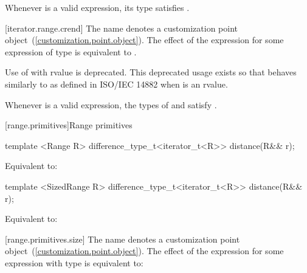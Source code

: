 \pnum
\enternote Whenever  is a valid expression, its
type satisfies . \exitnote

[iterator.range.crend]{}
\pnum
The name  denotes a customization point
object~(\ref{customization.point.object}). The effect of the expression
 for some expression  of type 
is equivalent to .

\pnum
Use of  with rvalue  is deprecated.
\enternote This deprecated usage exists so that 
behaves similarly to  as defined in ISO/IEC 14882 when
 is an rvalue. \exitnote

\pnum
\enternote Whenever  is a valid expression, the
types of  and  satisfy
. \exitnote

[range.primitives]{Range primitives}

%
\begin{itemdecl}
template <Range R>
difference_type_t<iterator_t<R>> distance(R&& r);
\end{itemdecl}

\begin{itemdescr}
\pnum \effects Equivalent to: 
\end{itemdescr}

%
\begin{itemdecl}
template <SizedRange R>
difference_type_t<iterator_t<R>> distance(R&& r);
\end{itemdecl}

\begin{itemdescr}
\pnum \effects Equivalent to: 
\end{itemdescr}

[range.primitives.size]{}
\pnum
The name  denotes a customization point
object~(\ref{customization.point.object}). The effect of the expression
 for some expression  with type
 is equivalent to:

